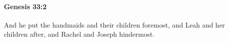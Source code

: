 
		\paragraph{Genesis 33:2} %
			\label{GENESIS-33-2}

			And he put the handmaids and their children foremost, and Leah and her children after, and Rachel and Joseph hindermost.


